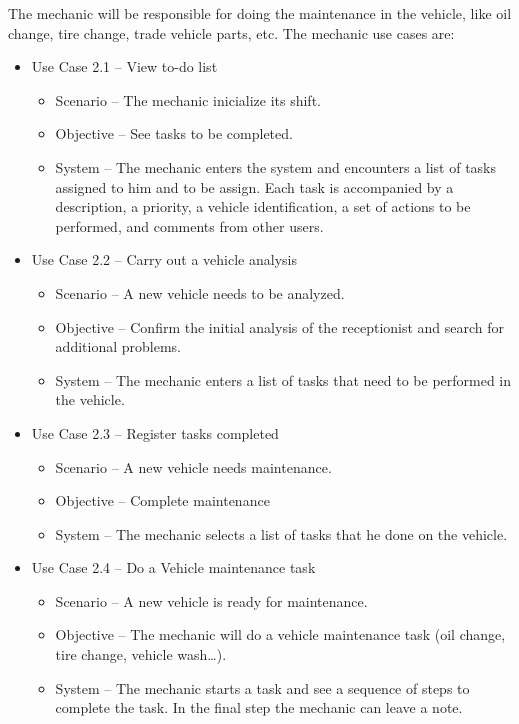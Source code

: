  The mechanic will be responsible for doing the maintenance in the vehicle, like oil change, tire change, trade vehicle parts, etc. 
 The mechanic use cases are:

  \begin{itemize}
    \item Use Case 2.1 – View to-do list
    \begin{itemize}
      \item Scenario – The mechanic inicialize its shift.
      \item Objective – See tasks to be completed.
      \item System – The mechanic enters the system and encounters a list of tasks assigned to him and to be assign. Each task is accompanied by a description, a priority, a vehicle identification, a set of actions to be performed, and comments from other users. 
    \end{itemize}
    \item Use Case 2.2 – Carry out a vehicle analysis 
    \begin{itemize}
      \item Scenario – A new vehicle needs to be analyzed.
      \item Objective – Confirm the initial analysis of the receptionist and search for additional problems.
      \item System – The mechanic enters a list of tasks that need to be performed in the vehicle. 
    \end{itemize}
    \item Use Case 2.3 – Register tasks completed
    \begin{itemize}
      \item Scenario – A new vehicle needs maintenance.
      \item Objective – Complete maintenance
      \item System – The mechanic selects a list of tasks that he done on the vehicle.
    \end{itemize}
  \item Use Case 2.4 – Do a Vehicle maintenance task
  \begin{itemize}
    \item Scenario – A new vehicle is ready for maintenance.
    \item Objective – The mechanic will do a vehicle maintenance task (oil change, tire change, vehicle wash…).
    \item System – The mechanic starts a task and see a sequence of steps to complete the task. In the final step the mechanic can leave a note.

\end{itemize}
\end{itemize}
